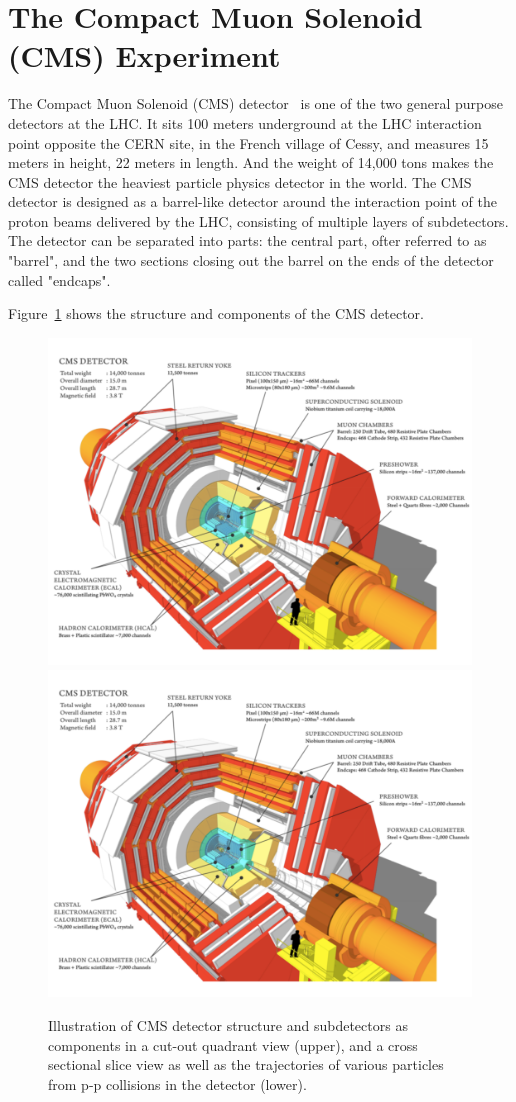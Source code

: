 \section{The Compact Muon Solenoid (CMS) Experiment}
The Compact Muon Solenoid (CMS) detector~\cite{lhc_cmsatcern} is one of the two general purpose detectors at the LHC. It sits 100 meters underground at the LHC interaction point opposite the CERN site, in the French village of Cessy, and measures 15 meters in height, 22 meters in length. And the weight of 14,000 tons makes the CMS detector the heaviest particle physics detector in the world. The CMS detector is designed as a barrel-like detector around the interaction point of the proton beams delivered by the LHC, consisting of multiple layers of subdetectors. The detector can be separated into parts: the central part, ofter referred to as "barrel", and the two sections closing out the barrel on the ends of the detector called "endcaps". 

Figure~\ref{fig:lhc_cmsstructure} shows the structure and components of the CMS detector.
\begin{figure}[htbp]
\begin{center}
\includegraphics[width=0.7\linewidth, page=1]{figures/lhc_cmsstructure.pdf}
\includegraphics[width=0.7\linewidth, page=2]{figures/lhc_cmsstructure.pdf}
\caption{Illustration of CMS detector structure and subdetectors as components in a cut-out quadrant view (upper), and a cross sectional slice view as well as the trajectories of various particles from p-p collisions in the detector (lower).}
\label{fig:lhc_cmsstructure}
\end{center}
\end{figure}


